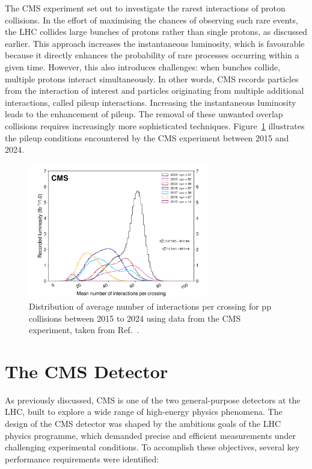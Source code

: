 The CMS experiment set out to investigate the rarest interactions of proton collisions. In the effort of maximising the chances of observing such rare events, the LHC collides large bunches of protons rather than single protons, as discussed earlier. This approach increases the instantaneous luminosity, which is favourable because it directly enhances the probability of rare processes occurring within a given time. However, this also introduces challenges: when bunches collide, multiple protons interact simultaneously. In other words, CMS records particles from the interaction of interest and particles originating from multiple additional interactions, called pileup interactions. Increasing the instantaneous luminosity leads to the enhancement of pileup. The removal of these unwanted overlap collisions requires increasingly more sophisticated techniques. Figure~\ref{Figure:Chapter3_CMS_Pileup} illustrates the pileup conditions encountered by the CMS experiment between 2015 and 2024.

\begin{figure}[h]
\centering
\includegraphics[width= 0.7\textwidth]{Figures/Chapter3/CMS_Pileup.pdf}
\caption{Distribution of average number of interactions per crossing for pp collisions between 2015 to 2024 using data from the CMS experiment, taken from Ref.~\cite{CMS_IntegratedLumi}.}
\label{Figure:Chapter3_CMS_Pileup}
\end{figure}

\section{The CMS Detector}

As previously discussed, CMS is one of the two general-purpose detectors at the LHC, built to explore a wide range of high-energy physics phenomena. The design of the CMS detector was shaped by the ambitious goals of the LHC physics programme, which demanded precise and efficient measurements under challenging experimental conditions. To accomplish these objectives, several key performance requirements were identified:

